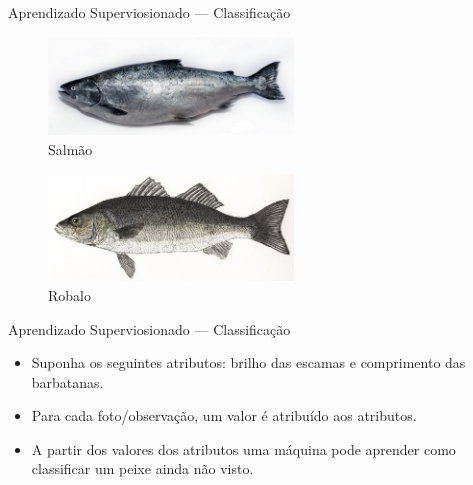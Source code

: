 \documentclass{libs/ufc_format}
\begin{document}
\begin{frame}{Aprendizado Superviosionado  --- Classificação}
    \begin{figure}
        \centering
        \includegraphics[width=6.5cm]{media/salmon}
        \caption{Salmão}
        \label{fSalmao}
    \end{figure}
    \vspace{-0.5cm}
    \begin{figure}
        \centering
        \includegraphics[width=6.5cm]{media/seabass}
        \caption{Robalo}
        \label{fRobalo}
    \end{figure}
\end{frame}

\begin{frame}{Aprendizado Superviosionado  --- Classificação}
    \begin{itemize}
        \justifying
        \item Suponha os seguintes atributos: brilho das escamas e comprimento das barbatanas.
        \item Para cada foto/observação, um valor é atribuído aos atributos.
        \item A partir dos valores dos atributos uma máquina pode aprender como classificar um peixe ainda não visto.
    \end{itemize}
\end{frame}

\end{document}
